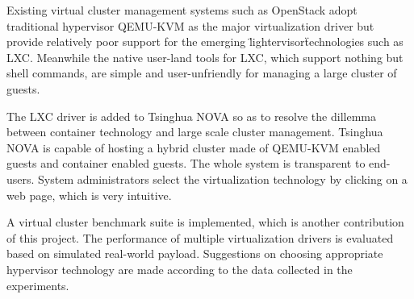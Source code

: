 
\begin{eabstract}
Existing virtual cluster management systems such as OpenStack adopt traditional
hypervisor QEMU-KVM as the major virtualization driver but provide relatively
poor support for the emerging \"lightervisor\" technologies such as LXC. Meanwhile
the native user-land tools for LXC, which support nothing but shell commands,
are simple and user-unfriendly for managing a large cluster of guests.

The LXC driver is added to Tsinghua NOVA so as to resolve the dillemma between
container technology and large scale cluster management. Tsinghua NOVA is
capable of hosting a hybrid cluster made of QEMU-KVM enabled guests and
container enabled guests. The whole system is transparent to end-users.
System administrators select the virtualization technology by clicking on
a web page, which is very intuitive.

A virtual cluster benchmark suite is implemented, which is another contribution
of this project. The performance of multiple virtualization drivers is
evaluated based on simulated real-world payload. Suggestions on choosing
appropriate hypervisor technology are made according to the data collected
in the experiments.
\end{eabstract}

